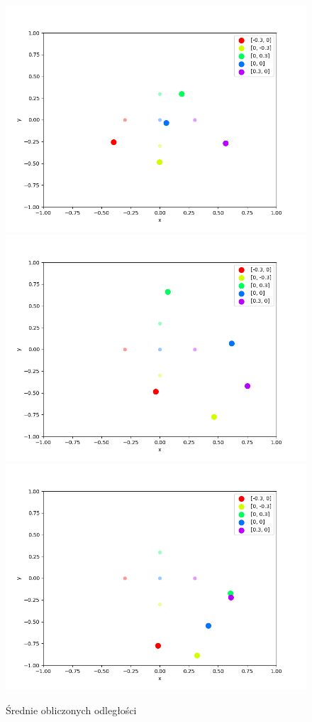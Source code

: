 \begin{figure}[h]
\centering
    \includegraphics[width=.49\textwidth]{pics/mult_lat_2d_angle/positions_0_mean.png}
    \includegraphics[width=.49\textwidth]{pics/mult_lat_2d_angle/positions_45_mean.png}
    \includegraphics[width=.49\textwidth]{pics/mult_lat_2d_angle/positions_90_mean.png}
\caption{Średnie obliczonych odległości}
\end{figure}

